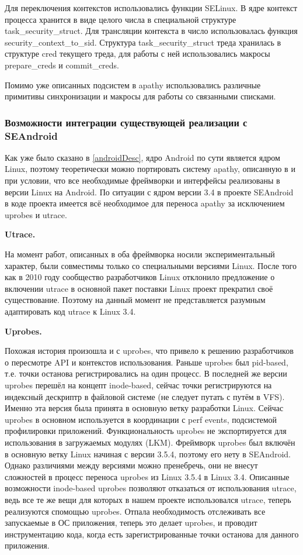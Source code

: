 Для переключения контекстов использовались функции SELinux. В ядре
контекст процесса хранится в виде целого числа в специальной структуре
task\_security\_struct. Для трансляции контекста в число использовалась
функция security\_context\_to\_sid. Структура task\_security\_struct
треда хранилась в структуре cred текущего треда, для работы с ней
использовались макросы prepare\_creds и commit\_creds.

Помимо уже описанных подсистем в apathy использовались различные
примитивы синхронизации и макросы для работы со связанными списками.

\label{sec:issled}\subsubsection{Возможности интеграции существующей реализации с
SEAndroid}

Как уже было сказано в \ref{androidDesc}, ядро Android по сути является
ядром Linux, поэтому теоретически можно портировать систему apathy,
описанную в \cite{sacharov} и \cite{bush} при условии, что все
необходимые фреймворки и интерфейсы реализованы в версии Linux на
Android. По ситуации с ядром версии 3.4 в проекте SEAndroid в коде
проекта имеется всё необходимое для переноса apathy за исключением
uprobes и utrace. 

\bigskip
{\bfseries Utrace.}

\bigskip
На момент работ, описанных в \cite{sacharov} оба фреймворка носили
экспериментальный характер, были совместимы только со специальными
версиями Linux. После того как в 2010 году сообщество разработчиков
Linux отклонило предложение о включении utrace в основной пакет поставки
Linux проект прекратил своё существование. Поэтому на данный момент не
представляется разумным адаптировать код utrace к Linux 3.4. 

\bigskip
{\bfseries Uprobes.}

\bigskip
Похожая история произошла и с uprobes, что привело к решению
разработчиков о пересмотре API и контекстов использования. Раньше
uprobes был pid-based, т.е. точки останова регистрировались на один
процесс. В последней же версии uprobes перешёл на концепт inode-based,
сейчас точки регистрируются на индексный дескриптр в файловой системе
(не следует путать с путём в VFS).  Именно эта версия была принята в
основную ветку разработки Linux. Сейчас uprobes в основном используется
в координации с perf events, подсистемой профилировки приложений.
Функциональность uprobes не экспортируется для использования в
загружаемых модулях (LKM).  Фреймворк uprobes был включён в основную
ветку Linux начиная с версии 3.5.4, поэтому его нету в SEAndroid. Однако
различиями между версиями можно пренебречь, они не внесут сложностей в
процесс переноса uprobes из Linux 3.5.4 в Linux 3.4. Описанные
возможности inode-based uprobes позволяют отказаться от использования
utrace, ведь все те же вещи для которых в нашем проекте использовался
utrace, теперь реализуются спомощью uprobes. Отпала необходимость
отслеживать все запускаемые в ОС приложения, теперь это делает uprobes,
и проводит инструментацию кода, когда есть зарегистрированные точки
останова для данного приложения.

